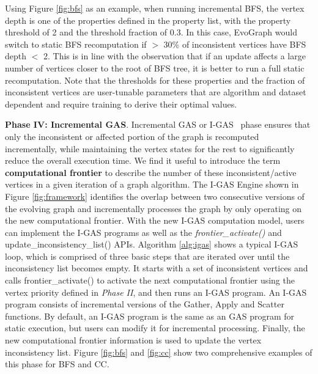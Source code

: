 Using Figure \ref{fig:bfs} as an example, when running incremental BFS, the vertex depth is one of the properties defined in the property list, with the property threshold of 2 and the threshold fraction of 0.3.  In this case, EvoGraph would switch to static BFS recomputation if $>$ 30\% of inconsistent vertices have BFS depth $<$ 2. This is in line with the observation that if an update affects a large number of vertices closer to the root of BFS tree, it is better to run a full static recomputation. Note that the thresholds for these properties and the fraction of inconsistent vertices are user-tunable parameters that are algorithm and dataset dependent and require training to derive their optimal values.



\textbf{Phase IV: Incremental GAS}. Incremental GAS or I-GAS~\cite{graphin} phase ensures that only the inconsistent or affected portion of the graph is recomputed incrementally, while maintaining the vertex states for the rest to significantly reduce the overall execution time. We find it useful to introduce the term {\bf computational frontier} to describe the number of these inconsistent/active vertices in a given iteration of a graph algorithm. The I-GAS Engine shown in Figure \ref{fig:framework} identifies the overlap between two consecutive versions of the evolving graph and incrementally processes the graph by only operating on the new computational frontier.  With the new I-GAS computation model, users can implement the I-GAS programs as well as the \textit{frontier\_activate()} and update\_inconsistency\_list() APIs. Algorithm \ref{alg:igas} shows a typical I-GAS loop, which is comprised of  three basic steps that are iterated over until the inconsistency list becomes empty. It starts with a set of inconsistent vertices and calls frontier\_activate() to activate the next computational frontier using the vertex priority defined in \textit{Phase II}, and then runs an I-GAS program. An I-GAS program consists of incremental versions of the Gather, Apply and Scatter functions. By default, an I-GAS program is the same as an GAS program for static execution, but users can modify it for incremental processing. Finally, the new computational frontier information is used to update the vertex inconsistency list. Figure \ref{fig:bfs} and \ref{fig:cc} show two comprehensive examples of this phase for BFS and CC.  


